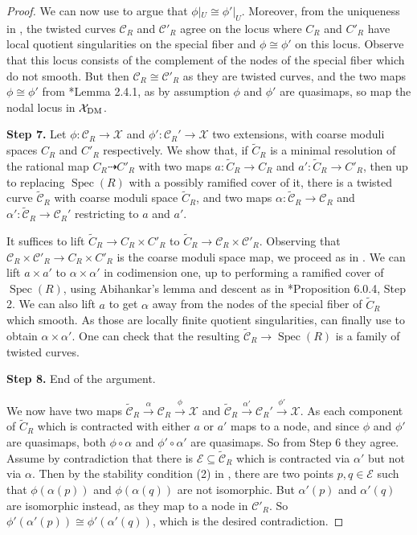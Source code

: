 \documentclass{amsart}
\newcommand{\sC}{\mathscr{C}}
\newcommand{\sE}{\mathscr{E}}
\newcommand{\cX}{\mathcal{X}}
\newcommand{\spec}{\operatorname{Spec}}
\newcommand{\dm}{{\rm DM}}
\theoremstyle{definition}
\theoremstyle{definition}
\begin{document}
{\begin{proof}
    We can now use  to argue that $\phi|_U\cong \phi'|_U$. Moreover, from the uniqueness in , the twisted curves $\sC_R$ and $\sC'_R$ agree on the locus where $C_R$ and $C'_R$ have local quotient singularities on the special fiber and $\phi\cong \phi'$ on this locus. Observe that this locus consists of the complement of the nodes of the special fiber which do not smooth. But then $\sC_R\cong \sC'_R$ as they are twisted curves, and the two maps $\phi\cong \phi'$ from \cite{AV_compactifying}*{Lemma 2.4.1}, as by assumption $\phi$ and $\phi'$ are quasimaps, so map the nodal locus in $\cX_\dm$.

     \textbf{Step 7.} Let $\phi:\sC_R\to \cX$ and $\phi':\sC_R'\to \cX$ two extensions, with coarse moduli spaces $C_R$ and $C'_R$ respectively. We show that, if $\widetilde{C}_R$ is a minimal resolution of the rational map $C_R \dashrightarrow C'_R$ with two maps $a:\widetilde{C}_R\to C_R$ and $a':\widetilde{C}_R\to C'_R$, then up to replacing $\spec(R)$ with a possibly ramified cover of it, there is a twisted curve $\widetilde{\sC}_R$ with coarse moduli space $\widetilde{C}_R$, and two maps $\alpha:\widetilde{\sC}_R\to \sC_R$ and $\alpha':\widetilde{\sC}_R\to \sC_R'$ restricting to $a$ and $a'$.

     It suffices to lift $\widetilde{C}_R\to C_R\times C'_R$ to $\widetilde{C}_R\to \sC_R\times \sC'_R$. Observing that $\sC_R\times \sC'_R\to C_R\times C'_R$ is the coarse moduli space map, we proceed as in \cite{AV_compactifying}. We can lift $a\times a'$ to $\alpha\times \alpha'$ in codimension one, up to performing a ramified cover of $\spec(R)$, using Abihankar's lemma and descent as in \cite{AV_compactifying}*{Proposition 6.0.4, Step 2}. We can also lift $a$ to get $\alpha$ away from the nodes of the special fiber of $\widetilde{C}_R$ which smooth. As those are locally finite quotient singularities, can finally use  to obtain $\alpha\times \alpha'$. One can check that the resulting $\widetilde{\sC}_R\to \spec(R)$ is a family of twisted curves.

     \textbf{Step 8.} End of the argument.

     We now have two maps $\widetilde{\sC}_R\xrightarrow{\alpha} \sC_R\xrightarrow{\phi} \cX$ and $\widetilde{\sC}_R\xrightarrow{\alpha'} \sC_R'\xrightarrow{\phi'} \cX$. As each component of $\widetilde{C}_R$ which is contracted with either $a$ or $a'$ maps to a node, and since $\phi$ and $\phi'$ are quasimaps, both $\phi\circ\alpha$ and $\phi'\circ\alpha'$ are quasimaps. So from Step 6 they agree. Assume by contradiction that there is $\sE\subseteq \widetilde{\sC}_R$ which is contracted via $\alpha'$ but not via $\alpha$. Then by the stability condition (2) in , there are two points $p,q\in \sE$ such that $\phi(\alpha(p))$ and $\phi(\alpha(q))$ are not isomorphic. But $\alpha'(p)$ and $\alpha'(q)$ are isomorphic instead, as they map to a node in $\sC'_R$. So $\phi'(\alpha'(p))\cong \phi'(\alpha'(q))$, which is the desired contradiction.


\end{proof}}
\end{document}

